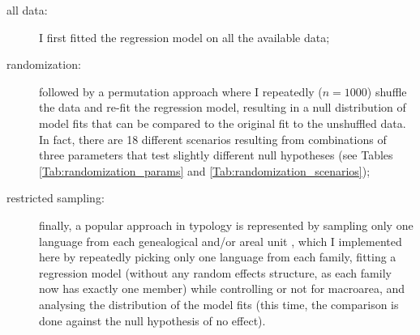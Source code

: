 \documentclass[twoside,onecolumn]{article}
\begin{document}
\begin{description}
  \item[all data:] I first fitted the regression model on all the available data;
  \item[randomization:] followed by a permutation approach where I repeatedly ($n = 1000$) shuffle the data and re-fit the regression model, resulting in a null distribution of model fits that can be compared to the original fit to the unshuffled data. In fact, there are 18 different scenarios resulting from combinations of three parameters that test slightly different null hypotheses (see Tables \ref{Tab:randomization_params} and \ref{Tab:randomization_scenarios});
  \item[restricted sampling:] finally, a popular approach in typology is represented by sampling only one language from each genealogical and/or areal unit \citep{dryer_sampling_areas_1989,bakker_sampling_language_2010,everett_climate_2015}, which I implemented here by repeatedly picking only one language from each family, fitting a regression model (without any random effects structure, as each family now has exactly one member) while controlling or not for macroarea, and analysing the distribution of the model fits (this time, the comparison is done against the null hypothesis of no effect).
\end{description}
\end{document}
